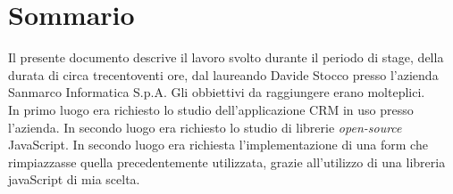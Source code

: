 
\cleardoublepage
{}
{}
\begingroup
\let\clearpage\relax
\let\cleardoublepage\relax
\let\cleardoublepage\relax

\chapter*{Sommario}

Il presente documento descrive il lavoro svolto durante il periodo di stage, della durata di circa trecentoventi ore, dal laureando Davide Stocco presso l'azienda Sanmarco Informatica S.p.A.
Gli obbiettivi da raggiungere erano molteplici.\\
In primo luogo era richiesto lo studio dell'applicazione CRM in uso presso l'azienda.
In secondo luogo era richiesto lo studio di librerie \emph{open-source} JavaScript.
In secondo luogo era richiesta l'implementazione di una form che rimpiazzasse quella precedentemente utilizzata, grazie all'utilizzo di una libreria javaScript di mia scelta. 

%
%

\endgroup			

\vfill

